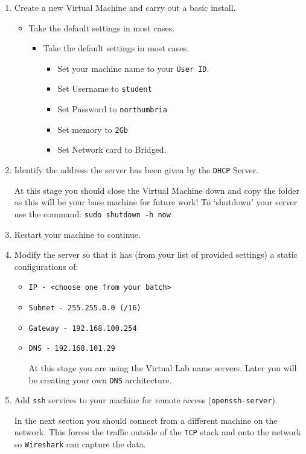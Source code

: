 \documentclass[11pt]{article}
\begin{document}
\begin{enumerate}
    \item Create a new Virtual Machine and carry out a basic install.
    \begin{itemize}
        \item Take the default settings in most cases.
        \begin{itemize}
            \item Take the default settings in most cases.
            \begin{itemize}
                \item Set your machine name to your \texttt{User ID}.
                \item Set Username to \texttt{student}
                \item Set Password to \texttt{northumbria}
                \item Set memory to \texttt{2Gb}
                \item Set Network card to Bridged.
            \end{itemize}
        \end{itemize} 
    \end{itemize}
    \item Identify the address the server has been given by the \texttt{DHCP} Server. 
        \begin{tcolorbox}[title={\textbf{Note:}}]
            At this stage you should close the Virtual Machine down and copy the folder as this will be your base machine for future work! To `shutdown' your server use the command: \texttt{sudo shutdown -h now} 
        \end{tcolorbox}
    \item Restart your machine to continue.
    \item Modify the server so that it has (from your list of provided settings) a static configurations of:
        \begin{itemize}
            \item \texttt{IP - <choose one from your batch>}
            \item \texttt{Subnet - 255.255.0.0 (/16)}
            \item \texttt{Gateway - 192.168.100.254}
            \item \texttt{DNS - 192.168.101.29}
                \begin{tcolorbox}[title={\textbf{Note:}}]
                    At this stage you are using the Virtual Lab name servers. Later you will be creating your own \texttt{DNS} architecture.
                \end{tcolorbox}
        \end{itemize}
    \item Add \texttt{ssh} services to your machine for remote access (\texttt{openssh-server}).
        \begin{tcolorbox}[title={\textbf{Note:}}]
            In the next section you should connect from a different machine on the network. This forces the traffic outside of the \texttt{TCP} stack and onto the network so \texttt{Wireshark} can capture the data.
        \end{tcolorbox}
    \end{enumerate}
\end{document}
